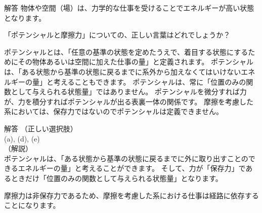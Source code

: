 \documentclass[uplatex,dvipdfmx,a4paper,11pt]{jsarticle}
\begin{document}
\begin{qlist}
\begin{itembox}[l]{解答}
            物体や空間（場）は、力学的な仕事を受けることでエネルギーが高い状態となります。
        \end{itembox}
	\qitem 「ポテンシャルと摩擦力」についての、正しい言葉はどれでしょうか？
		\begin{qlist2}
			\qitem ポテンシャルとは、「任意の基準の状態を定めたうえで、着目する状態にするためにその物体あるいは空間に加えた仕事の量」と定義されます。
			\qitem ポテンシャルは、「ある状態から基準の状態に戻るまでに系外から加えなくてはいけないエネルギーの量」と考えることもできます。
			\qitem ポテンシャルは、常に「位置のみの関数として与えられる状態量」ではありません。
			\qitem ポテンシャルを微分すれば力が、力を積分すればポテンシャルが出る表裏一体の関係です。
			\qitem 摩擦を考慮した系においては、保存力ではないのでポテンシャルは定義できません。
		\end{qlist2}
        \vspace{3mm}
        \begin{itembox}[l]{解答}
            （正しい選択肢）\\
            (a), (d), (e)\\
            （解説）\\
            ポテンシャルは、「ある状態から基準の状態に戻るまでに外に取り出すことのできるエネルギーの量」と考えることができます。
            そして、力が「保存力」であるときだけ「位置のみの関数として与えられる状態量」となります。
            
            摩擦力は非保存力であるため、摩擦を考慮した系における仕事は経路に依存することになります。
        \end{itembox}
\end{qlist}
\end{document}
